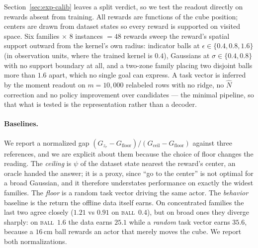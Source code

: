 Section~\ref{sec:exp-calib} leaves a split verdict, so we test the readout
directly on rewards absent from training. All rewards are functions of the cube
position; centers are drawn from dataset states so every reward is supported on
visited space. Six families $\times$ $8$ instances $=48$ rewards sweep the
reward's spatial support outward from the kernel's own radius: indicator balls at
$\epsilon\in\{0.4,0.8,1.6\}$ (in observation units, where the trained kernel is
$0.4$), Gaussians at $\sigma\in\{0.4,0.8\}$ with no support boundary at all, and a
two-zone family placing two disjoint balls more than $1.6$ apart, which no single
goal can express. A task vector is inferred by the moment readout on $m{=}10{,}000$
relabeled rows with no ridge, no $\hat N$ correction and no policy improvement over
candidates --- the minimal pipeline, so that what is tested is the representation
rather than a decoder.

\paragraph{Baselines.}
We report a normalized gap
$(G_{z_r}-G_{\mathrm{floor}})/(G_{\mathrm{ceil}}-G_{\mathrm{floor}})$ against three
references, and we are explicit about them because the choice of floor changes the
reading. The \emph{ceiling} is $\psi$ of the dataset state nearest the reward's
center, an oracle handed the answer; it is a proxy, since ``go to the center'' is
not optimal for a broad Gaussian, and it therefore understates performance on
exactly the widest families. The \emph{floor} is a random task vector driving the
same actor. The \emph{behavior} baseline is the return the offline data itself
earns. On concentrated families the last two agree closely ($1.21$ vs $0.91$ on
\textsc{ball}~$0.4$), but on broad ones they diverge sharply: on
\textsc{ball}~$1.6$ the data earns $25.1$ while a \emph{random} task vector earns
$35.6$, because a $16$\,cm ball rewards an actor that merely moves the cube. We
report both normalizations.

